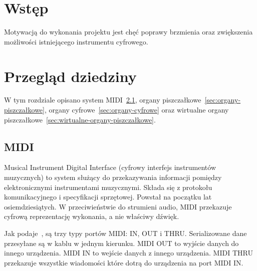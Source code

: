 \documentclass[11pt]{report}
\begin{document}
    \begin{titlepage}
        \centering
        \vspace{0.05\textheight}
        \vspace{0.06\textheight}
        \vspace{0.5\textheight}
        \vspace{0.03\textheight}
    \end{titlepage}

    \tableofcontents


    \chapter{Wstęp}\label{ch:wstęp}
    Motywacją do wykonania projektu jest chęć poprawy brzmienia oraz zwiększenia możliwości istniejącego instrumentu cyfrowego.


    \chapter{Przegląd dziedziny}
    W tym rozdziale opisano system MIDI~\ref{sec:midi}, organy piszczałkowe~\ref{sec:organy-piszczałkowe}, organy cyfrowe~\ref{sec:organy-cyfrowe}
    oraz wirtualne organy piszczałkowe~\ref{sec:wirtualne-organy-piszczałkowe}.


    \section{MIDI}\label{sec:midi}
    Musical Instrument Digital Interface (cyfrowy interfejs instrumentów muzycznych) to system służący do przekazywania informacji pomiędzy elektronicznymi instrumentami muzycznymi.
    Składa się z protokołu komunikacyjnego i specyfikacji sprzętowej.
    Powstał na początku lat osiemdziesiątych.
    W przeciwieństwie do strumieni audio, MIDI przekazuje cyfrową reprezentację wykonania, a nie właściwy dźwięk.

    Jak podaje~\cite{122929520160101}, są trzy typy portów MIDI: IN, OUT i THRU.
    Serializowane dane przesyłane są w kablu w jednym kierunku.
    MIDI OUT to wyjście danych do innego urządzenia.
    MIDI IN to wejście danych z innego urządzenia.
    MIDI THRU przekazuje wszystkie wiadomości które dotrą do urządzenia na port MIDI IN.
\end{document}
